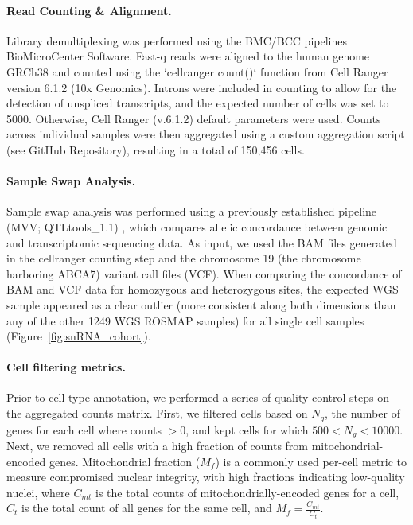 \documentclass[12pt]{article}
\begin{document}
\paragraph{Read Counting & Alignment.}
Library demultiplexing was performed using the BMC/BCC pipelines BioMicroCenter Software. Fast-q reads were aligned to the human genome GRCh38 and counted using the `cellranger count()` function from Cell Ranger version 6.1.2 (10x Genomics). Introns were included in counting to allow for the detection of unspliced transcripts, and the expected number of cells was set to 5000. Otherwise, Cell Ranger (v.6.1.2) default parameters were used. Counts across individual samples were then aggregated using a custom aggregation script (see GitHub Repository), resulting in a total of 150,456 cells.

\paragraph{Sample Swap Analysis.}
Sample swap analysis was performed using a previously established pipeline (MVV; QTLtools\_1.1) \cite{Fort2017-jq}, which compares allelic concordance between genomic and transcriptomic sequencing data. As input, we used the BAM files generated in the cellranger counting step and the chromosome 19 (the chromosome harboring ABCA7) variant call files (VCF). When comparing the concordance of BAM and VCF data for homozygous and heterozygous sites, the expected WGS sample appeared as a clear outlier (more consistent along both dimensions than any of the other 1249 WGS ROSMAP samples) for all single cell samples (Figure~\ref{fig:snRNA_cohort}).


\paragraph{Cell filtering metrics.}
Prior to cell type annotation, we performed a series of quality control steps on the aggregated counts matrix. First, we filtered cells based on $N_g$, the number of genes for each cell where counts $>0$, and kept cells for which $500 < N_g < 10000$. Next, we removed all cells with a high fraction of counts from mitochondrial-encoded genes. Mitochondrial fraction ($M_f$) is a commonly used per-cell metric to measure compromised nuclear integrity, with high fractions indicating low-quality nuclei, where $C_{mt}$ is the total counts of mitochondrially-encoded genes for a cell, $C_t$ is the total count of all genes for the same cell, and $M_f = \frac{C_{mt}}{C_t}$.
\end{document}
